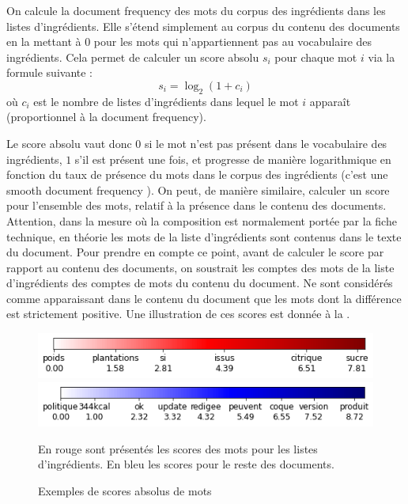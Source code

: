         On calcule la \og document frequency \fg des mots du corpus des ingrédients dans les listes d'ingrédients.
        Elle s'étend simplement au corpus du contenu des documents en la mettant à 0 pour les mots qui n'appartiennent pas au vocabulaire des ingrédients.
        Cela permet de calculer un score absolu $s_{i}$ pour chaque mot $i$ via la formule suivante :
        \[s_{i} = \log_{2}(1 + c_{i})\]
        où $c_{i}$ est le nombre de listes d'ingrédients dans lequel le mot $i$ apparaît (proportionnel à la document frequency).
       
        Le score absolu vaut donc $0$ si le mot n'est pas présent dans le vocabulaire des ingrédients, $1$ s'il est présent une fois, et progresse de manière logarithmique en fonction du taux de présence du mots dans le corpus des ingrédients (c'est une \og smooth document frequency \fg).
        On peut, de manière similaire, calculer un score pour l'ensemble des mots, relatif à la présence dans le contenu des documents.
        Attention, dans la mesure où la composition est normalement portée par la fiche technique, en théorie les mots de la liste d'ingrédients sont contenus dans le texte du document.
        Pour prendre en compte ce point, avant de calculer le score par rapport au contenu des documents, on soustrait les comptes des mots de la liste d'ingrédients des comptes de mots du contenu du document.
        Ne sont considérés comme apparaissant dans le contenu du document que les mots dont la différence est strictement positive.
        Une illustration de ces scores est donnée à la .

        \begin{figure}[htbp]
            \begin{center}
            \includegraphics[width=0.6\linewidth]{img/scores_bar.png}
            \includegraphics[width=0.6\linewidth]{img/corpus_score_bar.png}

            \caption{Exemples de scores absolus de mots}
            En rouge sont présentés les scores des mots pour les listes d'ingrédients. En bleu les scores pour le reste des documents.
            \end{center}            
            \label{fig:scores_bar}
        \end{figure}

